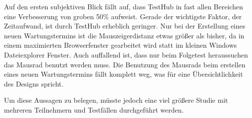 Auf den ersten subjektiven Blick fällt auf, dass TestHub in fast allen Bereichen eine 
Verbesserung von groben 50\% aufweist. Gerade der wichtigste Faktor, der Zeitaufwand, ist durch TestHub 
erheblich geringer. Nur bei der Erstellung eines neuen Wartungstermins
ist die Mauszeigerdistanz etwas größer als bisher, da in einem maximierten Browserfenster
gearbeitet wird statt im kleinen Windows Dateiexplorer Fenster. Auch auffallend ist,
dass nur beim Folgetest heraussuchen das Mausrad benutzt werden muss. Die Benutzung des 
Mausrads beim erstellen eines neuen Wartungstermins fällt komplett weg, was für 
eine Übersichtlichkeit des Designs spricht.

Um diese Aussagen zu belegen, müsste jedoch eine viel größere Studie mit mehreren 
Teilnehmern und Testfällen durchgeführt werden.



